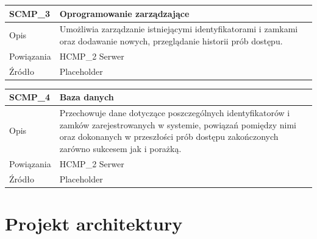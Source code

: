 \begin{table}
\begin{subtable}[c]{\textwidth}
                        \centering
                        \begin{tabular}{|p{2cm}|p{12cm}|}
                            \hline SCMP\_3      & \textbf{Oprogramowanie zarządzające} \\
                            \hline \cellcolor[gray]{0.8} Opis         & Umożliwia zarządzanie istniejącymi identyfikatorami i zamkami oraz dodawanie nowych, przeglądanie historii prób dostępu. \\
                            \hline \cellcolor[gray]{0.8} Powiązania   & HCMP\_2 Serwer    \\
                            \hline \cellcolor[gray]{0.8} Źródło       & Placeholder    \\
                            \hline
                        \end{tabular}
                        \label{tbl:scmp3}
                        \vspace{10mm}           
                    \end{subtable}                 
                    \label{tbl:sw_comp}
                \quad%
                    \begin{subtable}[c]{\textwidth}
                        \centering
                        \begin{tabular}{|p{2cm}|p{12cm}|}
                            \hline SCMP\_4      & \textbf{Baza danych} \\
                            \hline \cellcolor[gray]{0.8} Opis         & Przechowuje dane dotyczące poszczególnych identyfikatorów i zamków zarejestrowanych w systemie, powiązań pomiędzy nimi oraz dokonanych w przeszłości prób dostępu zakończonych zarówno sukcesem jak i porażką. \\
                            \hline \cellcolor[gray]{0.8} Powiązania   & HCMP\_2 Serwer    \\
                            \hline \cellcolor[gray]{0.8} Źródło       & Placeholder    \\
                            \hline
                        \end{tabular}
                        \label{tbl:scmp4}   
                        \vspace{10mm}       
                    \end{subtable} 
                \end{table}

        \pagebreak

        \section{Projekt architektury}

